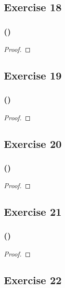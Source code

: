 \documentclass[14pt]{extarticle}
\begin{document}
\subsection{Exercise 18}

\subsubsection{()}

\begin{proof}

\end{proof}

\subsection{Exercise 19}

\subsubsection{()}

\begin{proof}

\end{proof}

\subsection{Exercise 20}

\subsubsection{()}

\begin{proof}

\end{proof}

\subsection{Exercise 21}

\subsubsection{()}

\begin{proof}

\end{proof}

\subsection{Exercise 22}
\end{document}
